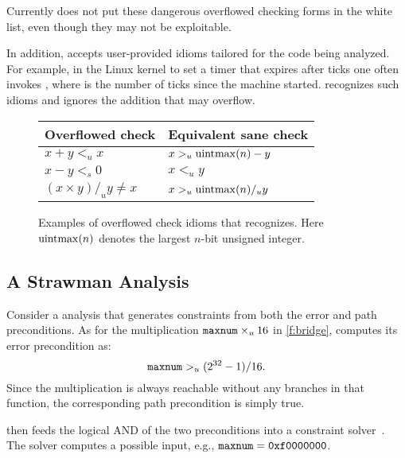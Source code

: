 Currently \sys does not put these dangerous overflowed checking
forms in the white list, even though they may not be exploitable.

In addition, \sys accepts user-provided idioms tailored for the
code being analyzed.  For example, in the Linux kernel to set a
timer that expires after  ticks one often invokes
, where  is the
number of ticks since the machine started.  \sys recognizes
such idioms and ignores the addition  that may
overflow.

\begin{figure}
\centering
\begin{tabular}{ll}
\toprule
Overflowed check & Equivalent sane check \\ \midrule
$x + y <_u x$ & $x >_u \operatorname{uintmax}(n) - y$ \\
$x - y <_s 0$ & $x <_u y$ \\
$(x \times y) /_u y \neq x$ & $x >_u \operatorname{uintmax}(n) /_u y$   \\
\bottomrule
\end{tabular}
\caption{Examples of overflowed check idioms that \sys recognizes.
Here $\operatorname{uintmax}(n)$ denotes the largest $n$-bit unsigned integer.}
\label{f:whitelist}
\end{figure}


\subsection{A Strawman Analysis}

Consider a \naive analysis that generates constraints from both the
error and path preconditions.  As for the multiplication $\texttt{maxnum}
\times_u 16$ in \autoref{f:bridge}, \sys computes its error
precondition as:
\begin{equation*}
\texttt{maxnum} >_u (2^{32} - 1) / 16.
\end{equation*}
Since the multiplication is always reachable without any branches
in that function, the corresponding path precondition is simply true.

\sys then feeds the logical AND of the two preconditions into a
constraint solver~\cite{boolector}.  The solver computes a possible
input, e.g., $\texttt{maxnum} = \texttt{0xf0000000}$.

